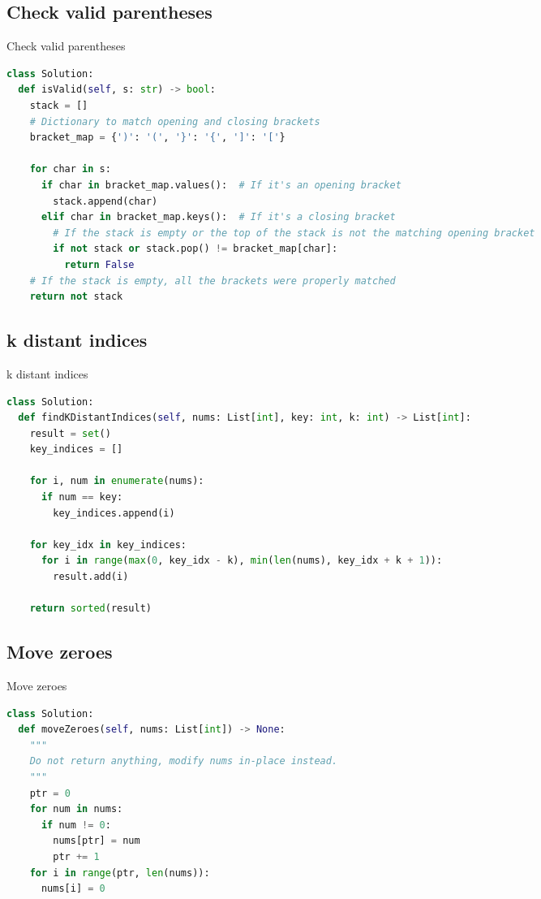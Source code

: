 \documentclass[a4paper,12pt]{article}
\begin{document}
\begin{multicols}{2}
\subsection{Check valid parentheses}

\begin{mycode}[label={lst:check-valid-parentheses}]{Check valid parentheses}
\begin{lstlisting}[language=Python]
class Solution:
  def isValid(self, s: str) -> bool:
    stack = []
    # Dictionary to match opening and closing brackets
    bracket_map = {')': '(', '}': '{', ']': '['}

    for char in s:
      if char in bracket_map.values():  # If it's an opening bracket
        stack.append(char)
      elif char in bracket_map.keys():  # If it's a closing bracket
        # If the stack is empty or the top of the stack is not the matching opening bracket
        if not stack or stack.pop() != bracket_map[char]:
          return False
    # If the stack is empty, all the brackets were properly matched
    return not stack
\end{lstlisting}
\end{mycode}

\subsection{k distant indices}
\begin{mycode}[label={lst:k-distant-indices}]{k distant indices}
\begin{lstlisting}[language=Python]
class Solution:
  def findKDistantIndices(self, nums: List[int], key: int, k: int) -> List[int]:
    result = set()
    key_indices = []
    
    for i, num in enumerate(nums):
      if num == key:
        key_indices.append(i)

    for key_idx in key_indices:
      for i in range(max(0, key_idx - k), min(len(nums), key_idx + k + 1)):
        result.add(i)

    return sorted(result)
\end{lstlisting}
\end{mycode}

\subsection{Move zeroes}

\begin{mycode}[label={lst:move-zeroes}]{Move zeroes}
\begin{lstlisting}[language=Python]
class Solution:
  def moveZeroes(self, nums: List[int]) -> None:
    """
    Do not return anything, modify nums in-place instead.
    """
    ptr = 0
    for num in nums:
      if num != 0:
        nums[ptr] = num
        ptr += 1
    for i in range(ptr, len(nums)):
      nums[i] = 0
\end{lstlisting}
\end{mycode}


\end{multicols}
\end{document}
